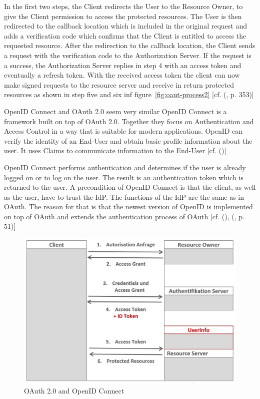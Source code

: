 {{		In the first two steps, the Client redirects the User to the Resource Owner, to give the Client permission to access the protected resources. The User is then redirected to the callback location which is included in the original request and adds a verification code which confirms that the Client is entitled to access the requested resource. After the redirection to the callback location, the Client sends a request with the verification code to the Authorization Server. If the request is a success, the Authorization Server replies in step 4 with an access token and eventually a refresh token. With the received access token the client can now make signed requests to the resource server and receive in return protected resources as shown in step five and six inf figure~\ref{fig:oaut-process2} [cf. (\cite{LeBlanc:2011:SocialApplications}, p. 353)]
		
		OpenID Connect and OAuth 2.0 seem very similar OpenID Connect is a framework built on top of OAuth 2.0. Together they focus on Authentication and Access Control in a way that is suitable for modern applications. OpenID can verify the identity of an End-User and obtain basic profile information about the user. It uses Claims to communicate information to the End-User [cf. (\cite{Sakimura:2014:OpenIDConnect})]
		
		OpenID Connect performs authentication and determines if the user is already logged on or to log on the user. The result is an authentication token which is returned to the user. A precondition of OpenID Connect is that the client, as well as the user, have to trust the IdP. The functions of the IdP are the same as in OAuth. The reason for that is that the newest version of OpenID is implemented on top of OAuth and extends the authentication process of OAuth  [cf. (\cite{Sakimura:2014:OpenIDConnect}), (\cite{Boyd:2012:GSOAuth}, p. 51)]
		
		\begin{figure}[h]
			\centering
			\includegraphics[width=0.8\linewidth]{images/openid-process}
			\caption{OAuth 2.0 and OpenID Connect \cite{Lodderstedt:2014:OpenID}}
			\label{fig:openid-process}
		\end{figure}
		
}}
